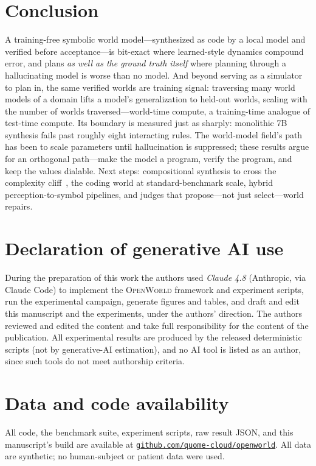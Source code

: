 \documentclass[11pt]{article}
\newcommand{\openworld}{\textsc{OpenWorld}}
\begin{document}
\section{Conclusion}
A training-free symbolic world model---synthesized as code by a local model and verified
before acceptance---is bit-exact where learned-style dynamics compound error, and plans
\emph{as well as the ground truth itself} where planning through a hallucinating model is
worse than no model. And beyond serving as a simulator to plan in, the same
verified worlds are training signal: traversing many world models of a domain
lifts a model's generalization to held-out worlds, scaling with the number of worlds
traversed---world-time compute, a training-time analogue of test-time compute.
Its boundary is measured just as sharply: monolithic 7B
synthesis fails past roughly eight interacting rules. The world-model field's
path has been to scale parameters until hallucination is suppressed;
these results argue for an orthogonal path---make the model a program, verify
the program, and keep the values dialable. Next steps: compositional
synthesis to cross the complexity cliff~\cite{poeworld2025}, the coding world
at standard-benchmark scale, hybrid perception-to-symbol pipelines, and
judges that propose---not just select---world repairs.

\section*{Declaration of generative AI use}
During the preparation of this work the authors used \emph{Claude 4.8}
(Anthropic, via Claude Code) to implement the \openworld{} framework and
experiment scripts, run the experimental campaign, generate figures and
tables, and draft and edit this manuscript and the experiments, under the
authors' direction. The authors reviewed and edited the content and
take full responsibility for the content of the publication. All experimental results are produced by the released
deterministic scripts (not by generative-AI estimation), and no AI tool is
listed as an author, since such tools do not meet authorship criteria.

\section*{Data and code availability}
All code, the benchmark suite, experiment scripts, raw result JSON, and this
manuscript's build are available at
\href{https://github.com/quome-cloud/openworld}{\nolinkurl{github.com/quome-cloud/openworld}}.
All data are synthetic; no human-subject or patient data were used.
\end{document}
